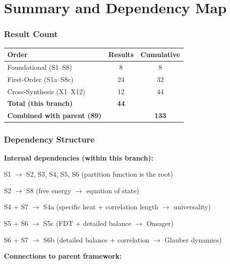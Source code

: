 \documentclass[11pt,letterpaper]{article}
\begin{document}
\newpage
\part{Summary and Dependency Map}

\section{Result Count}

\begin{center}
\renewcommand{\arraystretch}{1.3}
\begin{tabular}{lcc}
\textbf{Order} & \textbf{Results} & \textbf{Cumulative} \\
\hline
Foundational (S1--S8) & 8 & 8 \\
First-Order (S1a--S8c) & 24 & 32 \\
Cross-Synthesis (X1--X12) & 12 & 44 \\
\hline
\textbf{Total (this branch)} & \textbf{44} & \\
\textbf{Combined with parent (89)} & & \textbf{133} \\
\end{tabular}
\end{center}

\section{Dependency Structure}

\noindent\textbf{Internal dependencies (within this branch):}

S1 $\to$ S2, S3, S4, S5, S6 (partition function is the root)

S2 $\to$ S8 (free energy $\to$ equation of state)

S4 + S7 $\to$ S4a (specific heat + correlation length $\to$ universality)

S5 + S6 $\to$ S5c (FDT + detailed balance $\to$ Onsager)

S6 + S7 $\to$ S6b (detailed balance + correlation $\to$ Glauber dynamics)

\medskip

\noindent\textbf{Connections to parent framework:}
\end{document}
